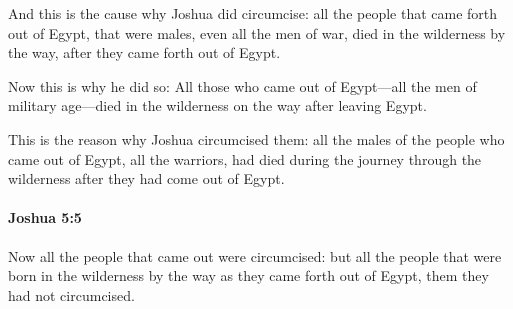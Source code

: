 			\begin{versebox}
					\item[BHS] 
					\item[ASV] And this is the cause why Joshua did circumcise: all the people that came forth out of Egypt, that were males, even all the men of war, died in the wilderness by the way, after they came forth out of Egypt.
					\item[NIV] Now this is why he did so: All those who came out of Egypt—all the men of military age—died in the wilderness on the way after leaving Egypt.
					\item[NRSV] This is the reason why Joshua circumcised them: all the males of the people who came out of Egypt, all the warriors, had died during the journey through the wilderness after they had come out of Egypt.
			\end{versebox}

		\paragraph{Joshua 5:5} %
			\label{JOSHUA-5-5}

			Now all the people that came out were circumcised: but all the people that were born in the wilderness by the way as they came forth out of Egypt, them they had not circumcised.

